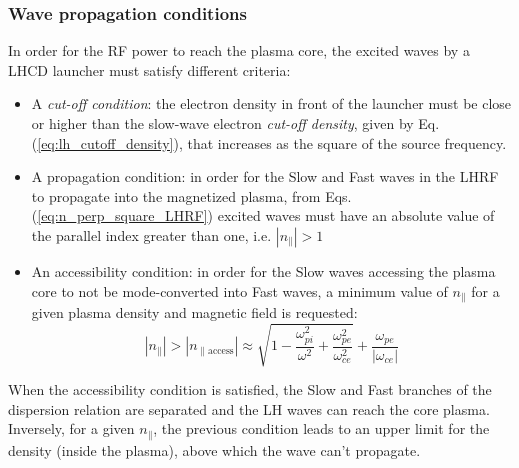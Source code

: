 \subsubsection{Wave propagation conditions}
In order for the RF power to reach the plasma core, the excited waves by a LHCD launcher must satisfy different criteria: 

\begin{itemize}
	\item  A \emph{cut-off condition}: the electron density in front of the launcher must be close or higher than the slow-wave electron \emph{cut-off density}, given by Eq.(\ref{eq:lh_cutoff_density}), that increases as the square of the source frequency. 
	\item A propagation condition: in order for the Slow and Fast waves in the LHRF to propagate into the magnetized plasma, from Eqs.(\ref{eq:n_perp_square_LHRF}) excited waves must have an absolute value of the parallel index greater than one, i.e. $|n_{\parallel}|>1$ 
	\item An accessibility condition: in order for the Slow waves accessing the plasma core to not be mode-converted into Fast waves, a minimum value of $n_{\parallel}$ for a given plasma density and magnetic field is requested:
	\begin{equation}
	|n_{\parallel} |>| n_{\parallel \mathrm{access}} | 
	\approx 
	\sqrt{1 
		- \frac{\omega_{pi}^2}{\omega^2} 
		+ \frac{\omega_{pe}^2}{\omega_{ce}^2}}
	+ \frac{\omega_{pe} }{| \omega_{ce} |}
	\label{eq:accessibilit_condition_LH}
	\end{equation}
\end{itemize}

When the accessibility condition is satisfied, the Slow and Fast branches of the dispersion relation are separated and the LH waves can reach the core plasma. Inversely, for a given $n_{\parallel}$, the previous condition leads to an upper limit for the density (inside the plasma), above which the wave can’t propagate.

